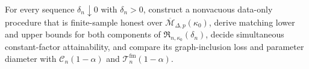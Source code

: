 For every sequence \(\delta_n\downarrow0\) with \(\delta_n>0\), construct a nonvacuous data-only procedure that is finite-sample honest over \(\overline{\mathcal M}_{\Delta,p}(\kappa_0)\), derive matching lower and upper bounds for both components of \(\mathfrak R_{n,\kappa_0}(\delta_n)\), decide simultaneous constant-factor attainability, and compare its graph-inclusion loss and parameter diameter with \(\mathcal C_n(1-\alpha)\) and \(\mathcal T_n^{\mathrm{fm}}(1-\alpha)\).